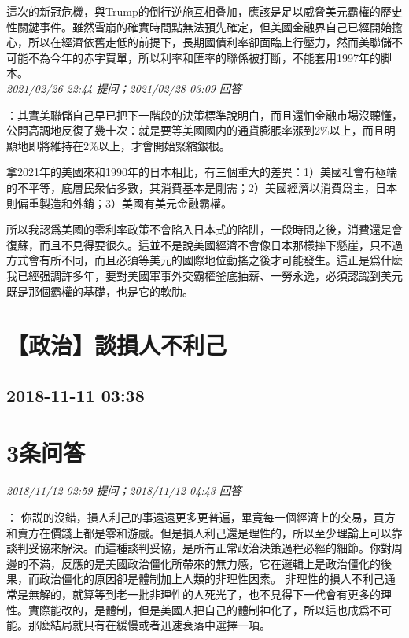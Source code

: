 \documentclass[twocolumn]{ctexart}
\begin{document}
這次的新冠危機，與Trump的倒行逆施互相叠加，應該是足以威脅美元霸權的歷史性關鍵事件。雖然雪崩的確實時間點無法預先確定，但美國金融界自己已經開始擔心，所以在經濟依舊走低的前提下，長期國債利率卻面臨上行壓力，然而美聯儲不可能不為今年的赤字買單，所以利率和匯率的聯係被打斷，不能套用1997年的脚本。
\\

\textit{\hfill\noindent\small 2021/02/26 22:44 提问；2021/02/28 03:09 回答}

：其實美聯儲自己早已把下一階段的決策標準說明白，而且還怕金融市場沒聽懂，公開高調地反復了幾十次：就是要等美國國内的通貨膨脹率漲到2\%以上，而且明顯地即將維持在2\%以上，才會開始緊縮銀根。

拿2021年的美國來和1990年的日本相比，有三個重大的差異：1）美國社會有極端的不平等，底層民衆佔多數，其消費基本是剛需；2）美國經濟以消費爲主，日本則偏重製造和外銷；3）美國有美元金融霸權。

所以我認爲美國的零利率政策不會陷入日本式的陷阱，一段時間之後，消費還是會復蘇，而且不見得要很久。這並不是說美國經濟不會像日本那樣摔下懸崖，只不過方式會有所不同，而且必須等美元的國際地位動搖之後才可能發生。這正是爲什麽我已經强調許多年，要對美國軍事外交霸權釜底抽薪、一勞永逸，必須認識到美元既是那個霸權的基礎，也是它的軟肋。
\\


\section{【政治】談損人不利己}
\subsection{2018-11-11 03:38}


\section{3条问答}

\textit{\hfill\noindent\small 2018/11/12 02:59 提问；2018/11/12 04:43 回答}

：
你説的沒錯，損人利己的事遠遠更多更普遍，畢竟每一個經濟上的交易，買方和賣方在價錢上都是零和游戲。但是損人利己還是理性的，所以至少理論上可以靠談判妥協來解決。而這種談判妥協，是所有正常政治決策過程必經的細節。你對周邊的不滿，反應的是美國政治僵化所帶來的無力感，它在邏輯上是政治僵化的後果，而政治僵化的原因卻是體制加上人類的非理性因素。 
非理性的損人不利己通常是無解的，就算等到老一批非理性的人死光了，也不見得下一代會有更多的理性。實際能改的，是體制，但是美國人把自己的體制神化了，所以這也成爲不可能。那麽結局就只有在緩慢或者迅速衰落中選擇一項。
\\
\end{document}
